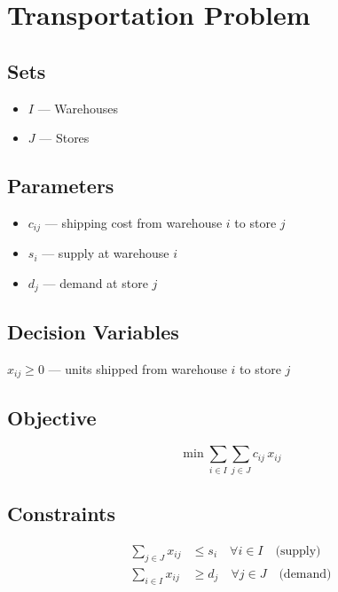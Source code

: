 \section*{Transportation Problem}
\subsection*{Sets}
\begin{itemize}
  \item $I$ --- Warehouses
  \item $J$ --- Stores
\end{itemize}

\subsection*{Parameters}
\begin{itemize}
  \item $c_{ij}$ --- shipping cost from warehouse $i$ to store $j$
  \item $s_i$ --- supply at warehouse $i$
  \item $d_j$ --- demand at store $j$
\end{itemize}

\subsection*{Decision Variables}
$x_{ij} \geq 0$ --- units shipped from warehouse $i$ to store $j$

\subsection*{Objective}
\begin{equation*}
  \min \sum_{i \in I} \sum_{j \in J} c_{ij}\, x_{ij}
\end{equation*}

\subsection*{Constraints}
\begin{align*}
  \sum_{j \in J} x_{ij} &\leq s_i \quad \forall i \in I \quad \text{(supply)}\\
  \sum_{i \in I} x_{ij} &\geq d_j \quad \forall j \in J \quad \text{(demand)}
\end{align*}
